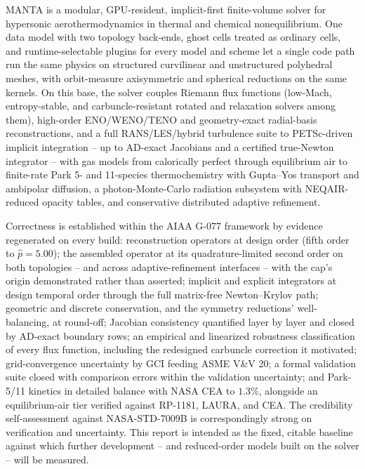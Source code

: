 \documentclass[journal,biblatex]{new-aiaa}
\begin{document}
MANTA is a modular, GPU-resident, implicit-first finite-volume solver for hypersonic aerothermodynamics in thermal and chemical nonequilibrium. One data model with two topology back-ends, ghost cells treated as ordinary cells, and runtime-selectable plugins for every model and scheme let a single code path run the same physics on structured curvilinear and unstructured polyhedral meshes, with orbit-measure axisymmetric and spherical reductions on the same kernels. On this base, the solver couples Riemann flux functions (low-Mach, entropy-stable, and carbuncle-resistant rotated and relaxation solvers among them), high-order ENO/WENO/TENO and geometry-exact radial-basis reconstructions, and a full RANS/LES/hybrid turbulence suite to PETSc-driven implicit integration -- up to AD-exact Jacobians and a certified true-Newton integrator -- with gas models from calorically perfect through equilibrium air to finite-rate Park 5- and 11-species thermochemistry with Gupta--Yos transport and ambipolar diffusion, a photon-Monte-Carlo radiation subsystem with NEQAIR-reduced opacity tables, and conservative distributed adaptive refinement.

Correctness is established within the AIAA G-077 framework by evidence regenerated on every build: reconstruction operators at design order (fifth order to $\hat p=5.00$); the assembled operator at its quadrature-limited second order on both topologies -- and across adaptive-refinement interfaces -- with the cap's origin demonstrated rather than asserted; implicit and explicit integrators at design temporal order through the full matrix-free Newton--Krylov path; geometric and discrete conservation, and the symmetry reductions' well-balancing, at round-off; Jacobian consistency quantified layer by layer and closed by AD-exact boundary rows; an empirical and linearized robustness classification of every flux function, including the redesigned carbuncle correction it motivated; grid-convergence uncertainty by GCI feeding ASME V\&V 20; a formal validation suite closed with comparison errors within the validation uncertainty; and Park-5/11 kinetics in detailed balance with NASA CEA to $1.3\%$, alongside an equilibrium-air tier verified against RP-1181, LAURA, and CEA. The credibility self-assessment against NASA-STD-7009B is correspondingly strong on verification and uncertainty. This report is intended as the fixed, citable baseline against which further development -- and reduced-order models built on the solver -- will be measured.

\printbibliography
\end{document}
